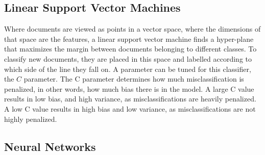 
\subsection{Linear Support Vector Machines}\label{bg:svm}

Where documents are viewed as points in a vector space, where the dimensions of that space are the features,  a linear support vector machine  finds a hyper-plane that maximizes the margin between documents belonging to different classes. To classify new documents, they are placed in this space and labelled according to which side of the line they fall on. A parameter can be tuned for this classifier, the $C$ parameter. The C parameter determines how much misclassification is penalized, in other words, how much bias there is in the model. A large C value results in low bias, and high variance, as misclassifications are heavily penalized. A low C value results in high bias and low variance, as misclassifications are not highly penalized. 






\subsection{Neural Networks}\label{bg:nn}




	
	
